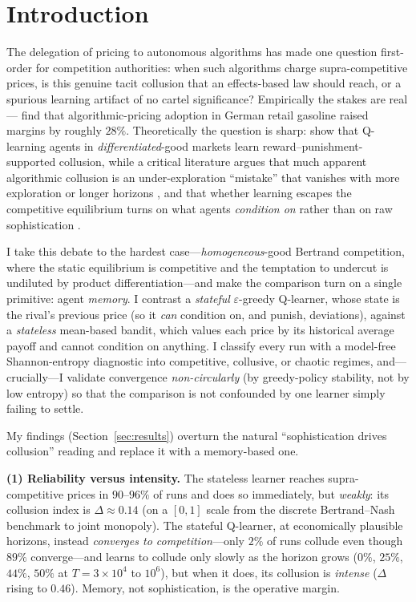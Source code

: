 \documentclass[11pt]{article}
\begin{document}
\section{Introduction}
The delegation of pricing to autonomous algorithms has made one question first-order for competition
authorities: when such algorithms charge supra-competitive prices, is this genuine tacit collusion that an
effects-based law should reach, or a spurious learning artifact of no cartel significance? Empirically the
stakes are real---\citet{assad2024algorithmic} find that algorithmic-pricing adoption in German retail
gasoline raised margins by roughly $28\%$. Theoretically the question is sharp: \citet{calvano2020artificial}
show that Q-learning agents in \emph{differentiated}-good markets learn reward--punishment-supported
collusion, while a critical literature argues that much apparent algorithmic collusion is an under-exploration
``mistake'' that vanishes with more exploration or longer horizons
\citep{abadalambin2023,abada2024collusion,denboermeylahnschinkel2024}, and that whether learning escapes the
competitive equilibrium turns on what agents \emph{condition on} rather than on raw sophistication
\citep{askerfershtmanpakes2024,possnig2023reinforcement}.

I take this debate to the hardest case---\emph{homogeneous}-good Bertrand competition, where the static
equilibrium is competitive and the temptation to undercut is undiluted by product differentiation---and
make the comparison turn on a single primitive: agent \emph{memory}. I contrast a \emph{stateful}
$\varepsilon$-greedy Q-learner, whose state is the rival's previous price (so it \emph{can} condition on,
and punish, deviations), against a \emph{stateless} mean-based bandit, which values each price by its
historical average payoff and cannot condition on anything. I classify every run with a model-free
Shannon-entropy diagnostic into competitive, collusive, or chaotic regimes, and---crucially---I validate
convergence \emph{non-circularly} (by greedy-policy stability, not by low entropy) so that the comparison is
not confounded by one learner simply failing to settle.

My findings (Section~\ref{sec:results}) overturn the natural ``sophistication drives collusion'' reading
and replace it with a memory-based one.

\textbf{(1) Reliability versus intensity.} The stateless learner reaches supra-competitive prices in
$90$--$96\%$ of runs and does so immediately, but \emph{weakly}: its collusion index is $\Delta\approx0.14$
(on a $[0,1]$ scale from the discrete Bertrand--Nash benchmark to joint monopoly). The stateful Q-learner,
at economically plausible horizons, instead \emph{converges to competition}---only $2\%$ of runs collude
even though $89\%$ converge---and learns to collude only slowly as the horizon grows ($0\%$, $25\%$, $44\%$,
$50\%$ at $T=3\times10^4$ to $10^6$), but when it does, its collusion is \emph{intense} ($\Delta$ rising to
$0.46$). Memory, not sophistication, is the operative margin.
\end{document}
